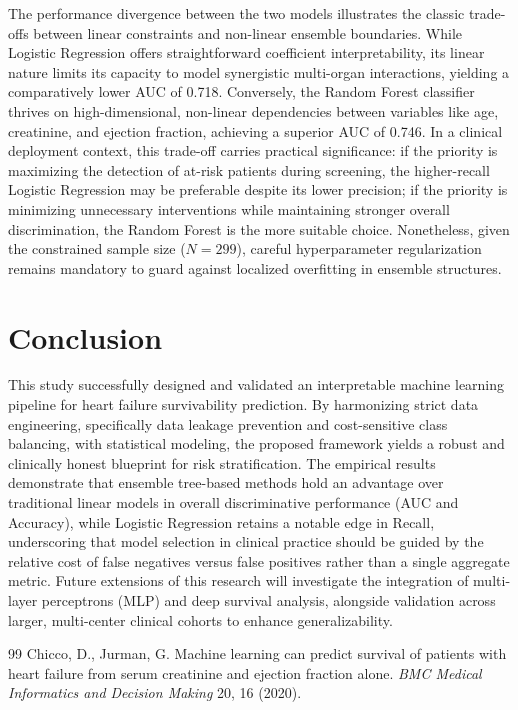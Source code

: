 \documentclass[11pt]{article} %
\begin{document}
The performance divergence between the two models illustrates the classic trade-offs between linear constraints and non-linear ensemble boundaries. While Logistic Regression offers straightforward coefficient interpretability, its linear nature limits its capacity to model synergistic multi-organ interactions, yielding a comparatively lower AUC of 0.718. Conversely, the Random Forest classifier thrives on high-dimensional, non-linear dependencies between variables like age, creatinine, and ejection fraction, achieving a superior AUC of 0.746. In a clinical deployment context, this trade-off carries practical significance: if the priority is maximizing the detection of at-risk patients during screening, the higher-recall Logistic Regression may be preferable despite its lower precision; if the priority is minimizing unnecessary interventions while maintaining stronger overall discrimination, the Random Forest is the more suitable choice. Nonetheless, given the constrained sample size ($N=299$), careful hyperparameter regularization remains mandatory to guard against localized overfitting in ensemble structures.

\section{Conclusion}

This study successfully designed and validated an interpretable machine learning pipeline for heart failure survivability prediction. By harmonizing strict data engineering, specifically data leakage prevention and cost-sensitive class balancing, with statistical modeling, the proposed framework yields a robust and clinically honest blueprint for risk stratification. The empirical results demonstrate that ensemble tree-based methods hold an advantage over traditional linear models in overall discriminative performance (AUC and Accuracy), while Logistic Regression retains a notable edge in Recall, underscoring that model selection in clinical practice should be guided by the relative cost of false negatives versus false positives rather than a single aggregate metric. Future extensions of this research will investigate the integration of multi-layer perceptrons (MLP) and deep survival analysis, alongside validation across larger, multi-center clinical cohorts to enhance generalizability.

\begin{thebibliography}{99}
 Chicco, D., Jurman, G. Machine learning can predict survival of patients with heart failure from serum creatinine and ejection fraction alone. \textit{BMC Medical Informatics and Decision Making} 20, 16 (2020).
\end{thebibliography}
\end{document}
